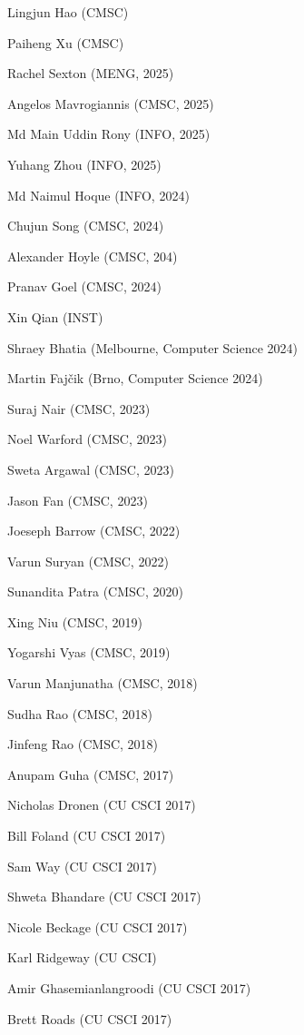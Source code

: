 {{  \begin{enumerate*}
    \item Lingjun Hao (CMSC)
    \item Paiheng Xu (CMSC)
    \item Rachel Sexton (MENG, 2025)
  \item Angelos Mavrogiannis (CMSC, 2025)
    \item Md Main Uddin Rony (INFO, 2025)
    \item Yuhang Zhou (INFO, 2025)
    \item Md Naimul Hoque (INFO, 2024)
  \item Chujun Song (CMSC, 2024)
    \item Alexander Hoyle (CMSC, 204)
  \item Pranav Goel (CMSC, 2024)
  \item Xin Qian (INST)
  \item Shraey Bhatia (Melbourne, Computer Science 2024)
    \item Martin Faj\v{c}ik (Brno, Computer Science 2024)
  \item Suraj Nair (CMSC, 2023)
  \item Noel Warford (CMSC, 2023)
  \item Sweta Argawal (CMSC, 2023)
    \item Jason Fan (CMSC, 2023)
  \item Joeseph Barrow (CMSC, 2022)
  \item Varun Suryan (CMSC, 2022)
    \item Sunandita Patra (CMSC, 2020)
\item Xing Niu (CMSC, 2019)
\item Yogarshi Vyas (CMSC, 2019)
\item Varun Manjunatha (CMSC, 2018)
\item Sudha Rao (CMSC, 2018)
\item Jinfeng Rao (CMSC, 2018)
\item Anupam Guha (CMSC, 2017)
\item Nicholas Dronen (CU CSCI 2017)
\item Bill Foland (CU CSCI 2017)
\item Sam Way (CU CSCI 2017)
\item Shweta Bhandare (CU CSCI 2017)
\item Nicole Beckage (CU CSCI 2017)
\item Karl Ridgeway (CU CSCI)
\item Amir Ghasemianlangroodi (CU CSCI 2017)
\item Brett Roads (CU CSCI 2017)

\end{enumerate*}}}
